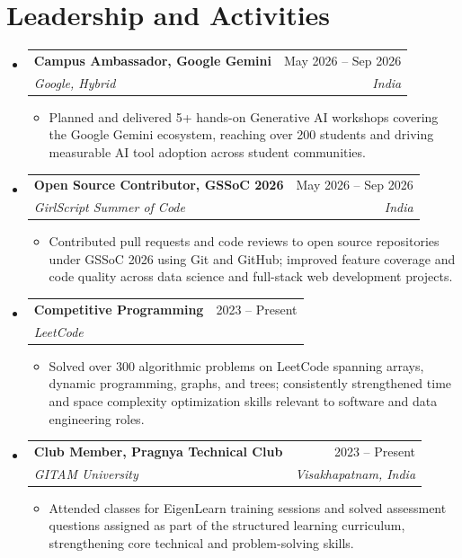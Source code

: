 \documentclass[letterpaper,10.5pt]{article}
\makeatletter
\newcommand{\resumeItem}[1]{%
  \item\small{#1}\vspace{-1.5pt}%
}
\newcommand{\resumeSubheading}[4]{%
  \vspace{-1pt}\item
    \begin{tabular*}{0.97\textwidth}[t]{l@{\extracolsep{\fill}}r}
      \textbf{#1} & \small{#2} \\
      \textit{\small#3} & \textit{\small #4} \\
    \end{tabular*}\vspace{-5pt}%
}
\newcommand{\resumeSubHeadingListStart}{%
  \begin{itemize}[leftmargin=0.13in, label={}]%
}
\newcommand{\resumeSubHeadingListEnd}{\end{itemize}}
\newcommand{\resumeItemListStart}{%
  \begin{itemize}[leftmargin=0.18in, topsep=1pt, itemsep=0pt, parsep=0pt]%
}
\newcommand{\resumeItemListEnd}{\end{itemize}\vspace{-2pt}}
\makeatother
\begin{document}
\vspace{4pt}

\section{Leadership and Activities}
\resumeSubHeadingListStart

  \resumeSubheading
    {Campus Ambassador, Google Gemini}{May 2026 -- Sep 2026}
    {Google, Hybrid}{India}
  \resumeItemListStart
    \resumeItem{Planned and delivered 5+ hands-on Generative AI workshops covering the Google Gemini ecosystem, reaching over 200 students and driving measurable AI tool adoption across student communities.}
  \resumeItemListEnd

  \vspace{1pt}

  \resumeSubheading
    {Open Source Contributor, GSSoC 2026}{May 2026 -- Sep 2026}
    {GirlScript Summer of Code}{India}
  \resumeItemListStart
    \resumeItem{Contributed pull requests and code reviews to open source repositories under GSSoC 2026 using Git and GitHub; improved feature coverage and code quality across data science and full-stack web development projects.}
  \resumeItemListEnd

  \vspace{1pt}

  \resumeSubheading
    {Competitive Programming}{2023 -- Present}
    {LeetCode}{}
  \resumeItemListStart
    \resumeItem{Solved over 300 algorithmic problems on LeetCode spanning arrays, dynamic programming, graphs, and trees; consistently strengthened time and space complexity optimization skills relevant to software and data engineering roles.}
  \resumeItemListEnd

  \vspace{1pt}

  \resumeSubheading
    {Club Member, Pragnya Technical Club}{2023 -- Present}
    {GITAM University}{Visakhapatnam, India}
  \resumeItemListStart
    \resumeItem{Attended classes for EigenLearn training sessions and solved assessment questions assigned as part of the structured learning curriculum, strengthening core technical and problem-solving skills.}
  \resumeItemListEnd

\resumeSubHeadingListEnd

\vspace{4pt}

\end{document}
